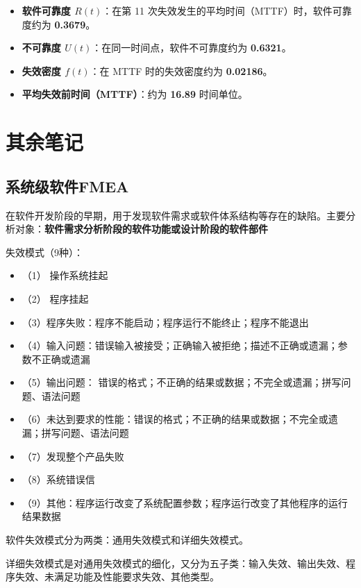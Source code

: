 \begin{itemize}
    \item \textbf{软件可靠度 \( R(t) \)}：在第 11 次失效发生的平均时间（MTTF）时，软件可靠度约为 \textbf{0.3679}。
    \item \textbf{不可靠度 \( U(t) \)}：在同一时间点，软件不可靠度约为 \textbf{0.6321}。
    \item \textbf{失效密度 \( f(t) \)}：在 MTTF 时的失效密度约为 \textbf{0.02186}。
    \item \textbf{平均失效前时间（MTTF）}：约为 \textbf{16.89} 时间单位。
\end{itemize}

\section{其余笔记}

\subsection{系统级软件FMEA}

在软件开发阶段的早期，用于发现软件需求或软件体系结构等存在的缺陷。主要分析对象：\textbf{软件需求分析阶段的软件功能或设计阶段的软件部件}

失效模式（9种）：

\begin{itemize}
  \item （1） 操作系统挂起
  \item （2） 程序挂起
  \item （3）程序失败：程序不能启动；程序运行不能终止；程序不能退出
  \item （4）输入问题：错误输入被接受；正确输入被拒绝；描述不正确或遗漏；参数不正确或遗漏
  \item （5）输出问题： 错误的格式；不正确的结果或数据；不完全或遗漏；拼写问题、语法问题
  \item （6）未达到要求的性能：错误的格式；不正确的结果或数据；不完全或遗漏；拼写问题、语法问题
  \item （7）发现整个产品失败
  \item （8）系统错误信
  \item （9）其他：程序运行改变了系统配置参数；程序运行改变了其他程序的运行结果数据
\end{itemize}

软件失效模式分为两类：通用失效模式和详细失效模式。

详细失效模式是对通用失效模式的细化，又分为五子类：输入失效、输出失效、程序失效、未满足功能及性能要求失效、其他类型。

